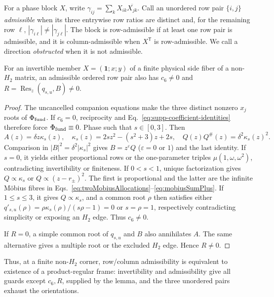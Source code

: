 {For a phase block $X$, write $\gamma_{ij}=\sum_kX_{ik}\overline{X_{jk}}$. Call an unordered row pair $\{i,j\}$ \emph{admissible} when its three entrywise row ratios are distinct and, for the remaining row $\ell$, $|\gamma_{i\ell}|\ne|\gamma_{j\ell}|$. The block is row-admissible if at least one row pair is admissible, and it is column-admissible when $X^{\mathsf T}$ is row-admissible. We call a direction \emph{obstructed} when it is not admissible.}

\begin{lemma}
\label{lem:supp-admissibility-guards}
{For an invertible member $X=(\mathbf1;x;y)$ of a finite physical side fiber of a non-$H_2$ matrix, an admissible ordered row pair also has $c_6\ne0$ and $R=\operatorname{Res}_z(q_{s,u},B)\ne0$.}
\end{lemma}

\begin{proof}
{The uncancelled companion equations make the three distinct nonzero $x_j$ roots of $\Phi_{\rm fund}$.  If $c_6=0$, reciprocity and Eq.~\eqref{eq:supp-coefficient-identities} therefore force $\Phi_{\rm fund}\equiv0$. Phase such that $s\in[0,3]$. Then}
\begin{equation}
{A(z)=\delta z\kappa_s(z),\quad
\kappa_s(z)=2sz^2-(s^2+3)z+2s,\quad
Q(z)Q^\#(z)=\delta^2\kappa_s(z)^2.}
\label{eq:supp-admissibility-kappa}
\end{equation}
{Comparison in $|B|^2=\delta^2|\kappa_s|^2$ gives $B=z^\varepsilon Q$ ($\varepsilon=0$ or $1$) and the last identity.  If $s=0$, it yields either proportional rows or the one-parameter triples $\mu(1,\omega,\omega^2)$, contradicting invertibility or finiteness.  If $0<s<1$, unique factorization gives $Q\propto\kappa_s$ or $Q\propto(z-r_\pm)^2$. The first is proportional and the latter are the infinite M\"obius fibres in Eqs.~\eqref{eq:twoMobiusAllocations}--\eqref{eq:mobiusSumPlus}.  If $1\le s\le3$, it gives $Q\propto\kappa_s$, and a common root $\rho$ then satisfies either $q'_{s,u}(\rho)=\rho\kappa_s(\rho)/(s\rho-1)=0$ or $s=\rho=1$, respectively contradicting simplicity or exposing an $H_2$ edge. Thus $c_6\ne0$.}

{If $R=0$, a simple common root of $q_{s,u}$ and $B$ also annihilates $A$. The same alternative gives a multiple root or the excluded $H_2$ edge. Hence $R\ne0$.}
\end{proof}

{Thus, at a finite non-$H_2$ corner, row/column admissibility is equivalent to existence of a product-regular frame: invertibility and admissibility give all guards except $c_6,R$, supplied by the lemma, and the three unordered pairs exhaust the orientations.}

